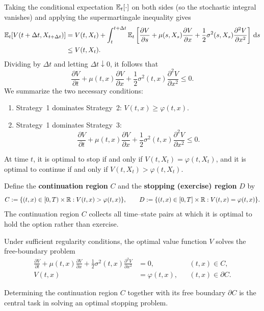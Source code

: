 Taking the conditional expectation $\mathbb{E}_t[\cdot]$ on both sides (so the stochastic integral vanishes) and applying the supermartingale inequality gives
\[
\begin{aligned}
    \mathbb{E}_t[V(t + \Delta t, X_{t+\Delta t})] &= V(t, X_t) + \int_t^{t+\Delta t} \mathbb{E}_t\left[\frac{\partial V}{\partial s} + \mu(s, X_s)\frac{\partial V}{\partial x} + \frac{1}{2}\sigma^2(s, X_s)\frac{\partial^2 V}{\partial x^2}\right]\,\mathrm{d} s \\
    &\le V(t, X_t).
\end{aligned}
\]
Dividing by $\Delta t$ and letting $\Delta t \downarrow 0$, it follows that
\[
\frac{\partial V}{\partial t} + \mu(t, x)\frac{\partial V}{\partial x} + \frac{1}{2}\sigma^2(t, x)\frac{\partial^2 V}{\partial x^2} \le 0.
\]
We summarize the two necessary conditions:
\begin{enumerate}
    \item Strategy~1 dominates Strategy~2: $V(t, x) \ge \varphi(t, x)$.
    \item Strategy~1 dominates Strategy~3:
    \[
    \frac{\partial V}{\partial t} + \mu(t, x)\frac{\partial V}{\partial x} + \frac{1}{2}\sigma^2(t, x)\frac{\partial^2 V}{\partial x^2} \le 0.
    \]
\end{enumerate}
At time $t$, it is optimal to stop if and only if $V(t, X_t) = \varphi(t, X_t)$, and it is optimal to continue if and only if $V(t, X_t) > \varphi(t, X_t)$.

Define the \textbf{continuation region} $C$ and the \textbf{stopping (exercise) region} $D$ by
\[
C := \{(t, x) \in [0, T) \times \mathbb{R} : V(t, x) > \varphi(t, x)\}, \qquad D := \{(t, x) \in [0, T] \times \mathbb{R} : V(t, x) = \varphi(t, x)\}.
\]
The continuation region $C$ collects all time--state pairs at which it is optimal to hold the option rather than exercise.

\begin{proposition}\label{prop:free-boundary-ito}
    Under sufficient regularity conditions, the optimal value function $V$ solves the free-boundary problem
    \[
    \begin{aligned}
        \frac{\partial V}{\partial t} + \mu(t, x)\frac{\partial V}{\partial x} + \frac{1}{2}\sigma^2(t, x)\frac{\partial^2 V}{\partial x^2} &= 0, && (t, x) \in C, \\
        V(t, x) &= \varphi(t, x), && (t, x) \in \partial C.
    \end{aligned}
    \]
\end{proposition}

Determining the continuation region $C$ together with its free boundary $\partial C$ is the central task in solving an optimal stopping problem.

